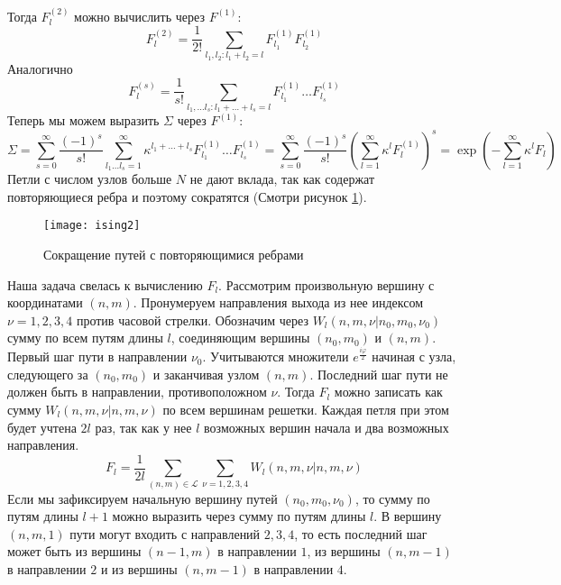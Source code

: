 \documentclass[a4paper,12pt]{article}
\theoremstyle{definition}
\theoremstyle{definition}
\theoremstyle{definition}
\begin{document}
Тогда $F_l^{(2)}$ можно вычислить через $F^{(1)}$:
\begin{equation}
  \label{eq:118}
  F^{(2)}_l=\frac{1}{2!}\sum_{l_1,l_2:l_1+l_2=l} F^{(1)}_{l_1} F^{(1)}_{l_2}
\end{equation}
Аналогично
\begin{equation}
  \label{eq:119}
  F^{(s)}_l=\frac{1}{s!}\sum_{l_1,\dots l_s:l_1+\dots+l_s=l} F^{(1)}_{l_1}\dots F^{(1)}_{l_s}
\end{equation}
Теперь мы можем выразить $\Sigma$ через $F^{(1)}$:
\begin{equation}
  \label{eq:120}
  \Sigma=\sum_{s=0}^{\infty}\frac{(-1)^s}{s!}\sum_{l_1\dots l_s=1}^{\infty} \kappa^{l_1+\dots+l_s}F^{(1)}_{l_1} \dots F^{(1)}_{l_s}=
  \sum_{s=0}^{\infty}\frac{(-1)^s}{s!}\left(\sum_{l=1}^{\infty} \kappa^{l}F^{(1)}_{l} \right)^s =\exp\left(-\sum_{l=1}^{\infty} \kappa^l F_l\right)
\end{equation}
Петли с числом узлов больше $N$ не дают вклада, так как содержат повторяющиеся ребра и поэтому сократятся (Смотри рисунок \ref{fig:ising-2}).
\begin{figure}[h!tb]
  \centering
  \texttt{[image: ising2]}
  \caption{Сокращение путей с повторяющимися ребрами}
  \label{fig:ising-2}
\end{figure}
Наша задача свелась к вычислению $F_l$. Рассмотрим произвольную вершину с координатами $(n,m)$. Пронумеруем направления выхода из нее индексом $\nu=1,2,3,4$ против часовой стрелки. Обозначим через $W_l (n,m,\nu|n_0,m_0,\nu_0)$ сумму по всем путям длины $l$, соединяющим вершины $(n_0,m_0)$ и $(n,m)$. Первый шаг пути в направлении $\nu_0$. Учитываются множители $e^{\frac{i\varphi}{2}}$ начиная с узла, следующего за $(n_0,m_0)$ и заканчивая узлом $(n,m)$. Последний шаг пути не должен быть в направлении, противоположном $\nu$. Тогда $F_l$ можно записать как сумму $W_l(n,m,\nu|n,m,\nu)$ по всем вершинам решетки. Каждая петля при этом будет учтена $2l$ раз, так как у нее $l$ возможных вершин начала и два возможных направления.
\begin{equation}
  \label{eq:121}
  F_l=\frac{1}{2l}\sum_{(n,m)\in \mathcal{L}} \sum_{\nu=1,2,3,4} W_l(n,m,\nu|n,m,\nu)
\end{equation}
Если мы зафиксируем начальную вершину путей $(n_0,m_0,\nu_0)$, то сумму по путям длины $l+1$ можно выразить через сумму по путям длины $l$. В вершину $(n,m,1)$ пути могут входить с направлений $2,3,4$, то есть последний шаг может быть из вершины $(n-1,m)$ в направлении $1$, из вершины $(n,m-1)$ в направлении $2$ и из вершины $(n,m-1)$ в направлении $4$.
\end{document}
